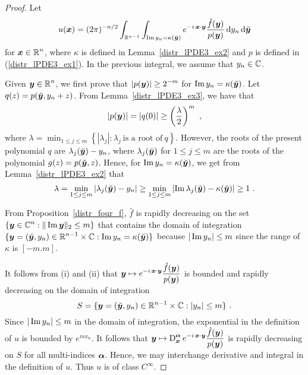 \begin{proof}
Let
\[
u({\bm{x}}) = (2\pi)^{-n/2} \int_{\mathbb{R}^{n-1}}
\int_{\operatorname{Im} y_n = \kappa(\breve{{\bm{y}}})}
e^{-i\, {\bm{x}}\cdot{\bm{y}}}
\frac{\hat{f}({\bm{y}})}{p({\bm{y}})} \,\mathrm{d}{y_n}\,\mathrm{d}{\breve{{\bm{y}}}}
\]
for $\displaystyle {\bm{x}} \in \mathbb{R}^n$, where $\kappa$ is defined in
Lemma~\ref{distr_lPDE3_ex2} and $p$ is defined in
(\ref{distr_lPDE3_ex1}).  In the previous integral, we
assume that $y_n \in \mathbb{C}$.

 Given $\displaystyle {\bm{y}} \in \mathbb{R}^n$, we first prove that
$\displaystyle |p({\bm{y}})| \geq 2^{-m}$ for
$\operatorname{Im} y_n = \kappa(\breve{{\bm{y}}})$.
Let $q(z) = p(\breve{{\bm{y}}}, y_n+z)$.
From Lemma~\ref{distr_lPDE3_ex3}, we have that
\[
\left| p({\bm{y}}) \right| = \left| q(0) \right| \geq
\left(\frac{\lambda}{2}\right)^m \ ,
\]
where
$\displaystyle
\lambda = \min_{1\leq j\leq m} \left\{ \left|\lambda_j\right| : \lambda_j
\ \text{is a root of} \ q \right\}$.
However, the roots of the present polynomial $q$ are
$\lambda_j(\breve{{\bm{y}}}) - y_n$, where $\lambda_j(\breve{{\bm{y}}})$ for
$1\leq j \leq m$ are the roots of the polynomial
$\displaystyle g(z) = p(\breve{{\bm{y}}}, z)$. Hence,
for $\operatorname{Im} y_n = \kappa(\breve{{\bm{y}}})$, we get from
Lemma~\ref{distr_lPDE3_ex2} that
\[
\lambda = \min_{1\leq j \leq m}
\left| \lambda_j(\breve{{\bm{y}}}) - y_n \right|
\geq \min_{1\leq j \leq m}
\left|\operatorname{Im} \lambda_j(\breve{{\bm{y}}}) - \kappa(\breve{{\bm{y}}}) \right|
\geq 1 \ .
\]

From Proposition~\ref{distr_four_f}, $\hat{f}$ is rapidly decreasing
on the set $\displaystyle \{{\bm{y}} \in \mathbb{C}^n : \|\operatorname{Im} {\bm{y}}\|_2 \leq m \}$
that contains the domain of integration
$\displaystyle \{ {\bm{y}} = (\breve{{\bm{y}}}, y_n) \in \mathbb{R}^{n-1}\times \mathbb{C} :
\operatorname{Im} y_n = \kappa(\breve{{\bm{y}}}) \}$ because
$|\operatorname{Im} y_n| \leq m$ since the range of $\kappa$ is $[-m.m]$.

It follows from (i) and (ii) that $\displaystyle
{\bm{y}} \mapsto e^{-i\, {\bm{x}}\cdot{\bm{y}}} \frac{\hat{f}({\bm{y}})}{p({\bm{y}})}$
is bounded and rapidly decreasing on the domain of integration
\[
S = \{{\bm{y}} = (\breve{{\bm{y}}}, y_n) \in \mathbb{R}^{n-1}\times \mathbb{C} :
|y_n| \leq m \} \ .
\]
Since $|\operatorname{Im} y_n|\leq m$ in the domain of integration, the
exponential in the definition of $u$ is bounded by $\displaystyle e^{m x_n}$.
It follows that
$\displaystyle {\bm{y}} \mapsto \operatorname{D}_{{\bm{x}}}^{{\bm{\alpha}}}
e^{-i\, {\bm{x}}\cdot{\bm{y}}} \frac{\hat{f}({\bm{y}})}{p({\bm{y}})}$
is rapidly decreasing on $S$ for all multi-indices ${\bm{\alpha}}$.
Hence, we may interchange derivative and integral in the definition of
$u$.  Thus $u$ is of class $\displaystyle C^\infty$.


\end{proof}
